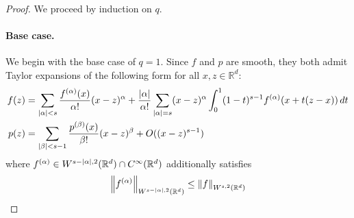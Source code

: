 \documentclass{article}
\newcommand{\Reals}{\mathbb{R}}
\newcommand{\1}{\mathbf{1}}
\newcommand{\Rd}{\Reals^d}
\theoremstyle{alden}
\theoremstyle{aldenthm}
\theoremstyle{definition}
\theoremstyle{remark}
\begin{document}
\begin{proof}	
	We proceed by induction on $q$. 
	\paragraph{Base case.}
	We begin with the base case of $q = 1$. Since $f$ and $p$ are smooth, they both admit Taylor expansions of the following form for all $x,z \in \Rd$:
	\begin{align*}
	f(z) & = \sum_{\abs{\alpha} < s} \frac{f^{(\alpha)}(x)}{\alpha!} (x - z)^{\alpha} + \frac{\abs{\alpha}}{\alpha!}\sum_{\abs{\alpha} = s} (x - z)^{\alpha} \int_{0}^{1}(1 - t)^{s - 1} f^{(\alpha)}(x + t(z - x)) \,dt\\
	p(z) & = \sum_{\abs{\beta} < s  - 1} \frac{p^{(\beta)}(x)}{\beta!} (x - z)^{\beta} + O((x - z)^{s - 1})
	\end{align*}
	where $f^{(\alpha)} \in W^{s - \abs{\alpha},2}(\Rd) \cap C^{\infty}(\Rd)$ additionally satisfies
	\begin{equation*}
	\norm{f^{(\alpha)}}_{W^{s - \abs{\alpha},2}(\Rd)} \leq \norm{f}_{W^{s,2}(\Rd)}
	\end{equation*}
	

\end{proof}
\end{document}
